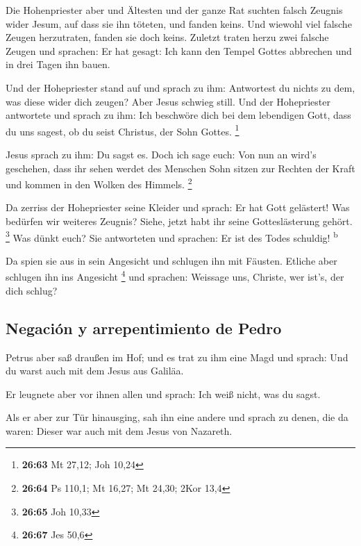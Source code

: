 Die Hohenpriester aber und Ältesten und der ganze Rat
suchten falsch Zeugnis wider Jesum, auf dass sie ihn töteten,
 und fanden keins. Und wiewohl viel falsche Zeugen
herzutraten, fanden sie doch keins. Zuletzt traten herzu zwei falsche
Zeugen  und sprachen: Er hat gesagt: Ich kann den Tempel
Gottes abbrechen und in drei Tagen ihn bauen.

 Und der Hohepriester stand auf und sprach zu ihm:
Antwortest du nichts zu dem, was diese wider dich zeugen?
 Aber Jesus schwieg still. Und der Hohepriester
antwortete und sprach zu ihm: Ich beschwöre dich bei dem lebendigen
Gott, dass du uns sagest, ob du seist Christus, der Sohn Gottes.
\footnote{\textbf{26:63} Mt 27,12; Joh 10,24}

 Jesus sprach zu ihm: Du sagst es. Doch ich sage euch:
Von nun an wird's geschehen, dass ihr sehen werdet des Menschen Sohn
sitzen zur Rechten der Kraft und kommen in den Wolken des Himmels.
\footnote{\textbf{26:64} Ps 110,1; Mt 16,27; Mt 24,30; 2Kor 13,4}

 Da zerriss der Hohepriester seine Kleider und sprach: Er
hat Gott gelästert! Was bedürfen wir weiteres Zeugnis? Siehe, jetzt habt
ihr seine Gotteslästerung gehört. \footnote{\textbf{26:65} Joh 10,33}
 Was dünkt euch? Sie antworteten und sprachen: Er ist des
Todes schuldig! \textsuperscript{b}

 Da spien sie aus in sein Angesicht und schlugen ihn mit
Fäusten. Etliche aber schlugen ihn ins Angesicht \footnote{\textbf{26:67}
  Jes 50,6}  und sprachen: Weissage uns, Christe, wer
ist's, der dich schlug?

\hypertarget{negaciuxf3n-y-arrepentimiento-de-pedro}{%
\subsection{Negación y arrepentimiento de
Pedro}\label{negaciuxf3n-y-arrepentimiento-de-pedro}}

 Petrus aber saß draußen im Hof; und es trat zu ihm eine
Magd und sprach: Und du warst auch mit dem Jesus aus Galiläa.

 Er leugnete aber vor ihnen allen und sprach: Ich weiß
nicht, was du sagst.

 Als er aber zur Tür hinausging, sah ihn eine andere und
sprach zu denen, die da waren: Dieser war auch mit dem Jesus von
Nazareth.

